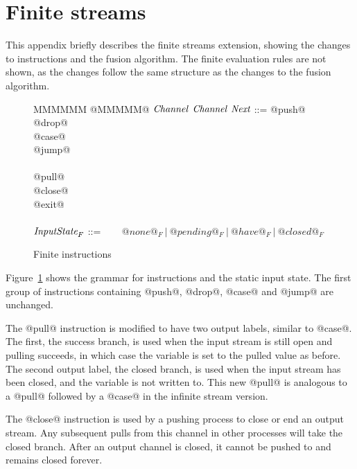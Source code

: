 \eject
\appendix

\section{Finite streams}
\label{s:FiniteDetails}

This appendix briefly describes the finite streams extension, showing the changes to instructions and the fusion algorithm.
The finite evaluation rules are not shown, as the changes follow the same structure as the changes to the fusion algorithm.

\begin{figure}
\begin{tabbing}
MMMMMM \TABDEF @MMMMM@  \TABSKIP $\textit{Channel}$ \TABSKIP $\textit{Channel}$ \TABSKIP $\textit{Next}$ \TABSKIP \kill
\Instr
    \> ::=\> @push@  \> \Chan  \> \Exp  \> \Next \\
    \TABALT  @drop@  \> \Chan  \>       \> \Next \\
    \TABALT  @case@  \> \Exp   \> \Next \> \Next \\
    \TABALT  @jump@  \>        \>       \> \Next \\
    \\
    \TABALT  @pull@  \> \Chan  \> \Var  \> \Next \> \Next \\
    \TABALT  @close@ \> \Chan  \>       \> \Next \\
    \TABALT  @exit@ 
\\
\\
$\textit{InputState}_F$ \> ::=  \> ~~~ $@none@_F ~|~ @pending@_F ~|~ @have@_F ~|~ @closed@_F$
\end{tabbing}
\caption{Finite instructions}
\label{fig:Finite:Instr}
\end{figure}

Figure~\ref{fig:Finite:Instr} shows the grammar for instructions and the static input state. The first group of instructions containing @push@, @drop@, @case@ and @jump@ are unchanged.

The @pull@ instruction is modified to have two output labels, similar to @case@. The first, the success branch, is used when the input stream is still open and pulling succeeds, in which case the variable is set to the pulled value as before. The second output label, the closed branch, is used when the input stream has been closed, and the variable is not written to. This new @pull@ is analogous to a @pull@ followed by a @case@ in the infinite stream version.

The @close@ instruction is used by a pushing process to close or end an output stream. Any subsequent pulls from this channel in other processes will take the closed branch. After an output channel is closed, it cannot be pushed to and remains closed forever.


